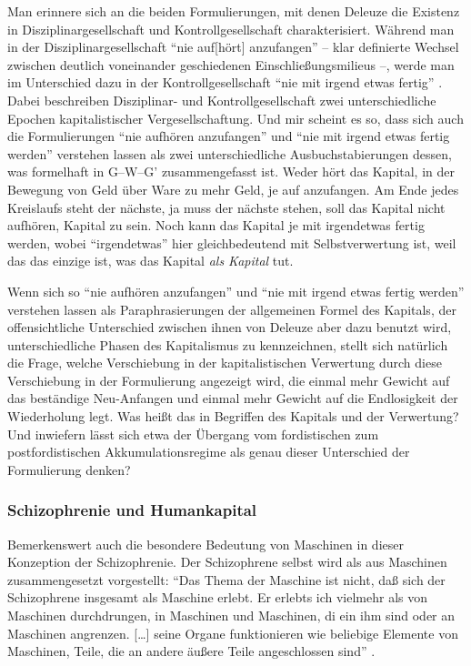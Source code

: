 \documentclass[12pt,
               DIV13,
               paper=a4,
               twoside=false,
               onehalfspacing,
               bibliography=totoc,
               toc=graduated,
               draft,
               ]{scrartcl}
\newcommand{\lips}{\dots\unkern}
\newcommand{\pc}[2]{\parencite[#1]{#2}}
\newcommand{\gwg}{G--W--G'\xspace}
\begin{document}
Man erinnere sich an die beiden Formulierungen, mit denen Deleuze die
Existenz in Disziplinargesellschaft und Kontrollgesellschaft
charakterisiert. Während man in der Disziplinargesellschaft "`nie
auf[hört] anzufangen"' \pc{257}{ps} -- klar definierte Wechsel
zwischen deutlich voneinander geschiedenen Einschließungsmilieus --,
werde man im Unterschied dazu in der Kontrollgesellschaft "`nie mit
irgend etwas fertig"' \pc{257}{ps}. Dabei beschreiben Disziplinar- und
Kontrollgesellschaft zwei unterschiedliche Epochen kapitalistischer
Vergesellschaftung. Und mir scheint es so, dass sich auch die
Formulierungen "`nie aufhören anzufangen"' und "`nie mit irgend etwas
fertig werden"' verstehen lassen als zwei unterschiedliche
Ausbuchstabierungen dessen, was formelhaft in \gwg zusammengefasst
ist. Weder hört das Kapital, in der Bewegung von Geld über Ware zu
mehr Geld, je auf anzufangen. Am Ende jedes Kreislaufs steht der
nächste, ja muss der nächste stehen, soll das Kapital nicht aufhören,
Kapital zu sein. Noch kann das Kapital je mit irgendetwas fertig
werden, wobei "`irgendetwas"' hier gleichbedeutend mit
Selbstverwertung ist, weil das das einzige ist, was das Kapital
\emph{als Kapital} tut.

Wenn sich so "`nie aufhören anzufangen"' und "`nie mit irgend etwas
fertig werden"' verstehen lassen als Paraphrasierungen der allgemeinen
Formel des Kapitals, der offensichtliche Unterschied zwischen ihnen
von Deleuze aber dazu benutzt wird, unterschiedliche Phasen des
Kapitalismus zu kennzeichnen, stellt sich natürlich die Frage, welche
Verschiebung in der kapitalistischen Verwertung durch diese
Verschiebung in der Formulierung angezeigt wird, die einmal mehr
Gewicht auf das beständige Neu-Anfangen und einmal mehr Gewicht auf
die Endlosigkeit der Wiederholung legt. Was heißt das in Begriffen des
Kapitals und der Verwertung? Und inwiefern lässt sich etwa der
Übergang vom fordistischen zum postfordistischen Akkumulationsregime
als genau dieser Unterschied der Formulierung denken?

\subsubsection{Schizophrenie und Humankapital}

Bemerkenswert auch die besondere Bedeutung von Maschinen in dieser
Konzeption der Schizophrenie. Der Schizophrene selbst wird als aus
Maschinen zusammengesetzt vorgestellt: "`Das Thema der Maschine ist
nicht, daß sich der Schizophrene insgesamt als Maschine erlebt. Er
erlebts ich vielmehr als von Maschinen durchdrungen, in Maschinen und
Maschinen, di ein ihm sind oder an Maschinen angrenzen. [\lips] seine
Organe funktionieren wie beliebige Elemente von Maschinen, Teile, die
an andere äußere Teile angeschlossen sind"' \pc{18}{schizg}.
\end{document}

